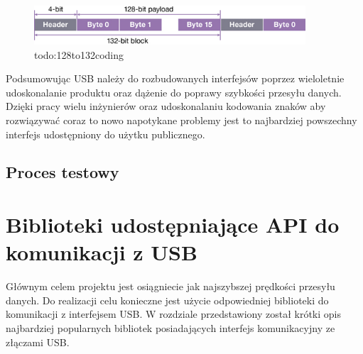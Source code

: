 \documentclass{BscUS}
\begin{document}
\begin{figure}[H]
\centering
\includegraphics[width=0.9\textwidth]{./img/128to132coding}
\caption{todo:128to132coding}
\label{fig:128to132coding}
\end{figure}
\indent Podsumowując USB należy do rozbudowanych interfejsów poprzez wieloletnie udoskonalanie produktu oraz dążenie do poprawy szybkości przesyłu danych. Dzięki pracy wielu inżynierów oraz udoskonalaniu kodowania znaków aby rozwiązywać coraz to nowo napotykane problemy jest to najbardziej powszechny interfejs udostępniony do użytku publicznego.
\section{Proces testowy}

\chapter{Biblioteki udostępniające API do komunikacji z USB}
\label{librariesChapter}
Głównym celem projektu jest osiągniecie jak najszybszej prędkości przesyłu danych. Do realizacji celu konieczne jest użycie odpowiedniej biblioteki do komunikacji z interfejsem USB. W rozdziale przedstawiony został krótki opis najbardziej popularnych bibliotek posiadających interfejs komunikacyjny ze złączami USB.
\end{document}
